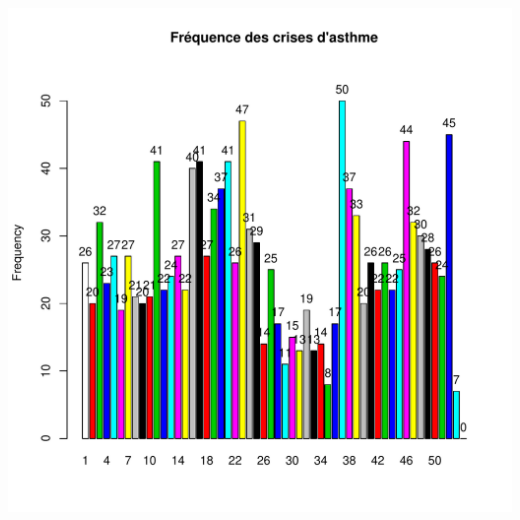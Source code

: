 \documentclass[12pt,english,french,twoside]{book}\usepackage[]{graphicx}\usepackage[]{color}
\makeatletter
\def\maxwidth{ %
  \ifdim\Gin@nat@width>\linewidth
    \linewidth
  \else
    \Gin@nat@width
  \fi
}
\makeatother
\begin{document}
\includegraphics[width=\maxwidth]{figure/asthme22} 
\end{document}
